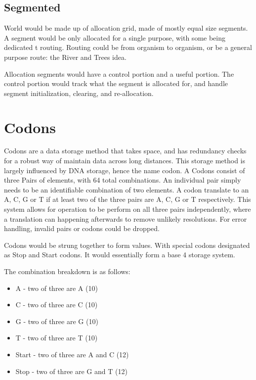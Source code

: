 \documentclass[article,12pt,oneside]{memoir}
\begin{document}
\subsection{Segmented}

World would be made up of allocation grid, made of mostly equal size segments.
A segment would be only allocated for a single purpose, with some being dedicated t routing.
Routing could be from organism to organism, or be a general purpose route: the River and Trees idea.

Allocation segments would have a control portion and a useful portion.
The control portion would track what the segment is allocated for, and handle segment initialization, clearing, and re-allocation.


\section{Codons}\label{codons}

Codons are a data storage method that takes space, and has redundancy checks for a robust way of maintain data across long distances.
This storage method is largely influenced by DNA storage, hence the name codon.
A Codons consist of three Pairs of elements, with 64 total combinations.
An individual pair simply needs to be an identifiable combination of two elements.
A codon translate to an A, C, G or T if at least two of the three pairs are A, C, G or T respectively.
This system allows for operation to be perform on all three pairs independently, where a translation can happening afterwards to remove unlikely resolutions.
For error handling, invalid pairs or codons could be dropped.

Codons would be strung together to form values. With special codons designated as Stop and Start codons.
It would essentially form a base 4 storage system.

The combination breakdown is as follows:
\begin{itemize}
	\item A - two of three are A (10)
	\item C - two of three are C (10)
	\item G - two of three are G (10)
	\item T - two of three are T (10)
	\item Start - two of three are A and C (12)
	\item Stop - two of three are G and T (12)
\end{itemize}
\end{document}
